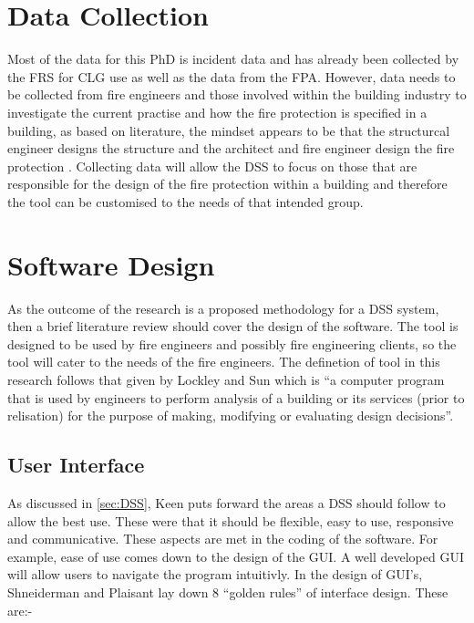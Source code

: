 \documentclass[table,a4paper,oneside]{book}
\begin{document}
\section{Data Collection}
\label{sec:Data_Collection}
Most of the data for this PhD is incident data and has already been collected by the \ac{FRS} for \ac{CLG} use as well as the data from the \ac{FPA}. However, data needs to be collected from fire engineers and those involved within the building industry to investigate the current practise and how the fire protection is specified in a building, as based on literature, the mindset appears to be that the structurcal engineer designs the structure and the architect and fire engineer design the fire protection \citep{Alfawakhiri2005}. Collecting data will allow the \ac{DSS} to focus on those that are responsible for the design of the fire protection within a building and therefore the tool can be customised to the needs of that intended group.

\section{Software Design}
\label{sec:Software_Design}
As the outcome of the research is a proposed methodology for a \ac{DSS} system, then a brief literature review should cover the design of the software. The tool is designed to be used by fire engineers and possibly fire engineering clients, so the tool will cater to the needs of the fire engineers. The definetion of tool in this research follows that given by Lockley and Sun \citep{Lockley1995} which is ``a computer program that is used by engineers to perform analysis of a building or its services (prior to relisation) for the purpose of making, modifying or evaluating design decisions''.

\subsection{User Interface}
\label{sec:User_Interface}

As discussed in \ref{sec:DSS}, Keen puts forward the areas a \ac{DSS} should follow to allow the best use. These were that it should be flexible, easy to use, responsive and communicative. These aspects are met in the coding of the software. For example, ease of use comes down to the design of the \ac{GUI}. A well developed \ac{GUI} will allow users to navigate the program intuitivly. In the design of \ac{GUI}'s, Shneiderman and Plaisant lay down 8 ``golden rules'' of interface design. These are:-
\end{document}
